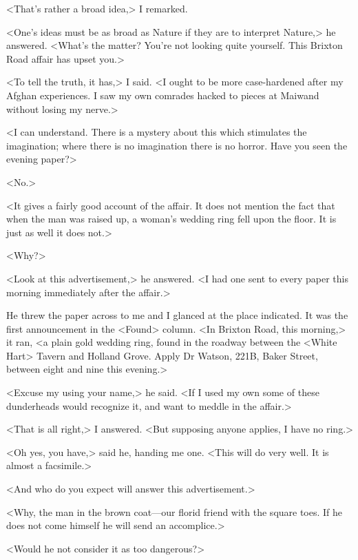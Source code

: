 <That's rather a broad idea,> I remarked.

<One's ideas must be as broad as Nature if they are to interpret Nature,> he answered. <What's the matter? You're not looking quite yourself. This Brixton Road affair has upset you.>

<To tell the truth, it has,> I said. <I ought to be more case-hardened after my Afghan experiences. I saw my own comrades hacked to pieces at Maiwand without losing my nerve.>

<I can understand. There is a mystery about this which stimulates the imagination; where there is no imagination there is no horror. Have you seen the evening paper?>

<No.>

<It gives a fairly good account of the affair. It does not mention the fact that when the man was raised up, a woman's wedding ring fell upon the floor. It is just as well it does not.>

<Why?>

<Look at this advertisement,> he answered. <I had one sent to every paper this morning immediately after the affair.>

He threw the paper across to me and I glanced at the place indicated. It was the first announcement in the <Found> column. <In Brixton Road, this morning,> it ran, <a plain gold wedding ring, found in the roadway between the <White Hart> Tavern and Holland Grove. Apply Dr Watson, 221B, Baker Street, between eight and nine this evening.>

<Excuse my using your name,> he said. <If I used my own some of these dunderheads would recognize it, and want to meddle in the affair.>

<That is all right,> I answered. <But supposing anyone applies, I have no ring.>

<Oh yes, you have,> said he, handing me one. <This will do very well. It is almost a facsimile.>

<And who do you expect will answer this advertisement.>

<Why, the man in the brown coat—our florid friend with the square toes. If he does not come himself he will send an accomplice.>

<Would he not consider it as too dangerous?>

